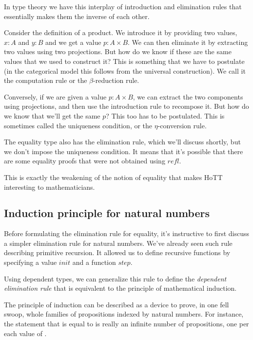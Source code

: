 \documentclass[DaoFP]{subfiles}
\begin{document}
In type theory we have this interplay of introduction and elimination rules that essentially makes them the inverse of each other. 

Consider the definition of a product. We introduce it by providing two values, $x \colon A$ and $y \colon B$ and we get a value $p \colon A \times B$. We can then eliminate it by extracting two values using two projections. But how do we know if these are the same values that we used to construct it? This is something that we have to postulate (in the categorical model this follows from the universal construction). We call it the computation rule or the $\beta$-reduction rule.

Conversely, if we are given a value $p \colon A \times B$, we can extract the two components using projections, and then use the introduction rule to recompose it. But how do we know that we'll get the same $p$? This too has to be postulated. This is sometimes called the uniqueness condition, or the $\eta$-conversion rule.

The equality type also has the elimination rule, which we'll discuss shortly, but we don't impose the uniqueness condition. It means that it's possible that there are some equality proofs that were not obtained using $\mathit{refl}$. 

This is exactly the weakening of the notion of equality that makes HoTT interesting to mathematicians.

\subsection{Induction principle for natural numbers}

Before formulating the elimination rule for equality, it's instructive to first discuss a simpler elimination rule for natural numbers. We've already seen such rule describing primitive recursion. It allowed us to define recursive functions by specifying a value $\mathit{init}$ and a function $\mathit{step}$.

Using dependent types, we can generalize this rule to define the \emph{dependent elimination rule} that is equivalent to the principle of mathematical induction.

The principle of induction can be described as a device to prove, in one fell swoop, whole families of propositions indexed by natural numbers. For instance, the statement that  is equal to  is really an infinite number of propositions, one per each value of . 
\end{document}
